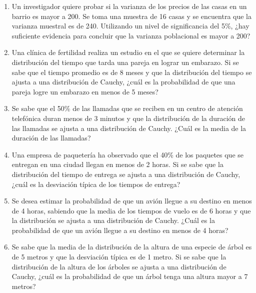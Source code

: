 \begin{Ejer}
\begin{enumerate}
    \item Un investigador quiere probar si la varianza de los precios de las casas en un barrio es mayor a 200. Se toma una muestra de 16 casas y se encuentra que la varianza muestral es de 240. Utilizando un nivel de significancia del 5\%, ¿hay suficiente evidencia para concluir que la varianza poblacional es mayor a 200?
    \item Una clínica de fertilidad realiza un estudio en el que se quiere determinar la distribución del tiempo que tarda una pareja en lograr un embarazo. Si se sabe que el tiempo promedio es de 8 meses y que la distribución del tiempo se ajusta a una distribución de Cauchy, ¿cuál es la probabilidad de que una pareja logre un embarazo en menos de 5 meses?
    \item Se sabe que el 50\% de las llamadas que se reciben en un centro de atención telefónica duran menos de 3 minutos y que la distribución de la duración de las llamadas se ajusta a una distribución de Cauchy. ¿Cuál es la media de la duración de las llamadas?
    \item Una empresa de paquetería ha observado que el 40\% de los paquetes que se entregan en una ciudad llegan en menos de 2 horas. Si se sabe que la distribución del tiempo de entrega se ajusta a una distribución de Cauchy, ¿cuál es la desviación típica de los tiempos de entrega?
    \item Se desea estimar la probabilidad de que un avión llegue a su destino en menos de 4 horas, sabiendo que la media de los tiempos de vuelo es de 6 horas y que la distribución se ajusta a una distribución de Cauchy. ¿Cuál es la probabilidad de que un avión llegue a su destino en menos de 4 horas?
    \item Se sabe que la media de la distribución de la altura de una especie de árbol es de 5 metros y que la desviación típica es de 1 metro. Si se sabe que la distribución de la altura de los árboles se ajusta a una distribución de Cauchy, ¿cuál es la probabilidad de que un árbol tenga una altura mayor a 7 metros?

\end{enumerate}
\end{Ejer} 



